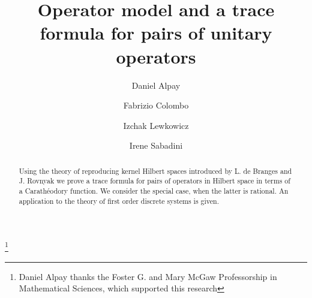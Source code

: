 \documentclass[12pt]{amsart}
\theoremstyle{definition}
\theoremstyle{remark}
\numberwithin{equation}{section}
\begin{document}
\title[Trace formula]{Operator model and a trace formula for pairs of unitary operators}



\author[D. Alpay]{Daniel Alpay}
\address{(DA) Schmid College of Science and Technology \\
Chapman University\\
One University Drive
Orange, California 92866\\
USA}

\author[F. Colombo]{Fabrizio Colombo}
\address{(FC) Politecnico di
  Milano\\Dipartimento di Matematica\\Via E. Bonardi, 9\\20133 Milano\\Italy}

  \author[I. Lewkowicz]{Izchak Lewkowicz}
  \address{(IL) School of Electrical and Computer Engineering\\
Ben-Gurion University of the Negev\\ P.O.B. 653\\ Beer-Sheva, 84105\\
Israel}

\author[I. Sabadini]{Irene Sabadini}
\address{(IS) Politecnico di
  Milano\\Dipartimento di Matematica\\Via E. Bonardi, 9\\20133 Milano\\Italy}



\thanks{
           Daniel Alpay thanks the Foster G. and Mary McGaw Professorship in Mathematical Sciences, which supported this research}


         \begin{abstract}
           Using the theory of reproducing kernel Hilbert spaces introduced by L. de Branges and J. Rovnyak we prove a trace formula for pairs of operators in Hilbert space
           in terms of a Carath\'eodory function. We consider the special case, when the latter is rational. An
           application to the theory of first order discrete systems is given.
\end{abstract}
\maketitle
\tableofcontents
\end{document}
